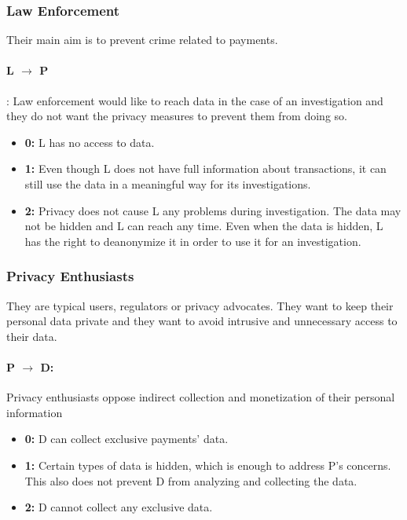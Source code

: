 \documentclass[runningheads]{llncs}
\begin{document}
 \subsubsection{Law Enforcement}
  Their main aim is to prevent crime related to payments. 
  \paragraph{L $\rightarrow$ P}: Law enforcement would like to reach data in the case of an investigation and they do not want the privacy measures to prevent them from doing so.
  
  \begin{itemize}
  	\item \textbf{0:} L has no access to data. 
  	\item \textbf{1:} Even though L does not have full information about transactions, it can still use the data in a meaningful way for its investigations.
  	\item \textbf{2:} Privacy does not cause L any problems during investigation. The data may not be hidden and L can reach any time. Even when the data is hidden, L has the right to deanonymize it in order to use it for an investigation.
  \end{itemize}
  
  
 \subsubsection{Privacy Enthusiasts}
 They are typical users, regulators or privacy advocates. They want to keep their personal data private and they want to avoid intrusive and unnecessary access to their data.
 \paragraph{P $\rightarrow$ D:} Privacy enthusiasts oppose indirect collection and monetization of their personal information
 
   \begin{itemize}
 	\item \textbf{0:} D can collect exclusive payments' data. %
 	\item \textbf{1:} Certain types of data is hidden, which is enough to address P's concerns. This also does not prevent D from analyzing and collecting the data. 
 	\item \textbf{2:} D cannot collect any exclusive data.
 \end{itemize}
\end{document}
